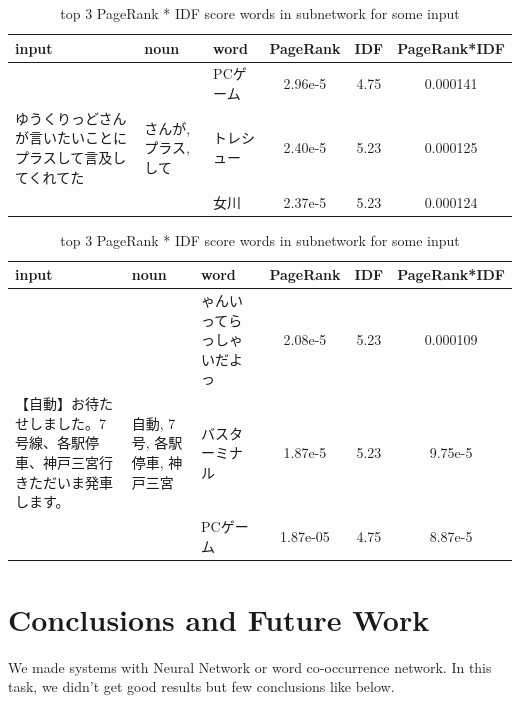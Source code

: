 \documentclass{../style/sig-alternate}
\begin{document}
\begin{table}
    \begin{center}
    \caption{top 3 PageRank * IDF score words in subnetwork for some input}
    \label{tab:subnetwork1}
    \begin{tabular}{|p{20em}|p{5em}|p{5em}|c|c|c|} \hline
    input & noun & word & PageRank & IDF & PageRank*IDF\\ \hline
    & & PCゲーム & 2.96e-5 & 4.75 & 0.000141\\ \cline{3-6}
    ゆうくりっどさんが言いたいことにプラスして言及してくれてた & さんが, プラス, して & トレシュー & 2.40e-5 & 5.23 & 0.000125\\ \cline{3-6}
    & & 女川 & 2.37e-5 & 5.23 & 0.000124\\ \hline
    \end{tabular}
    \end{center}
\end{table}


\begin{table}
    \begin{center}
    \caption{top 3 PageRank * IDF score words in subnetwork for some input}
    \label{tab:subnetwork2}
    \begin{tabular}{|p{20em}|p{5em}|p{5em}|c|c|c|} \hline
    input & noun & word & PageRank & IDF & PageRank*IDF\\ \hline
    & & ゃんいってらっしゃいだよっ & 2.08e-5 & 5.23 & 0.000109\\ \cline{3-6}
    【自動】\newline お待たせしました。\newline 7号線、各駅停車、神戸三宮行き\newline ただいま発車します。 & 自動, 7号, 各駅停車, 神戸三宮 & バスターミナル & 1.87e-5 & 5.23 & 9.75e-5\\ \cline{3-6}
    & & PCゲーム & 1.87e-05 & 4.75 & 8.87e-5\\ \hline
    \end{tabular}
    \end{center}
\end{table}

\section{Conclusions and Future Work}
\label{sec:conclusions}
We made systems with Neural Network or word co-occurrence network. In this task, we didn't get good results but few conclusions like below.
\end{document}
